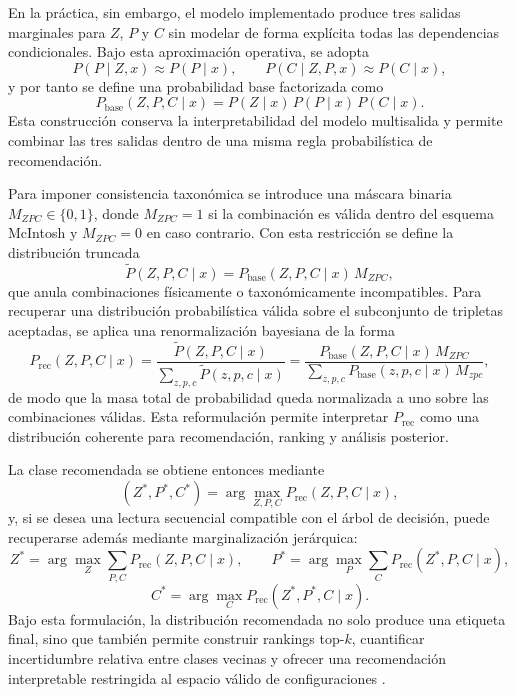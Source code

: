 En la práctica, sin embargo, el modelo implementado produce tres salidas marginales para $Z$, $P$ y $C$ sin modelar de forma explícita todas las dependencias condicionales. Bajo esta aproximación operativa, se adopta
\begin{equation}
P(P\mid Z,x)\approx P(P\mid x),
\qquad
P(C\mid Z,P,x)\approx P(C\mid x),
\end{equation}
y por tanto se define una probabilidad base factorizada como
\begin{equation}
P_{\mathrm{base}}(Z,P,C\mid x)=P(Z\mid x)\,P(P\mid x)\,P(C\mid x).
\end{equation}
Esta construcción conserva la interpretabilidad del modelo multisalida y permite combinar las tres salidas dentro de una misma regla probabilística de recomendación.

Para imponer consistencia taxonómica se introduce una máscara binaria $M_{ZPC}\in\{0,1\}$, donde $M_{ZPC}=1$ si la combinación es válida dentro del esquema McIntosh y $M_{ZPC}=0$ en caso contrario. Con esta restricción se define la distribución truncada
\begin{equation}
\widetilde{P}(Z,P,C\mid x)=P_{\mathrm{base}}(Z,P,C\mid x)\,M_{ZPC},
\end{equation}
que anula combinaciones físicamente o taxonómicamente incompatibles. Para recuperar una distribución probabilística válida sobre el subconjunto de tripletas aceptadas, se aplica una renormalización bayesiana de la forma
\begin{equation}
P_{\mathrm{rec}}(Z,P,C\mid x)=
\frac{\widetilde{P}(Z,P,C\mid x)}{\sum_{z,p,c}\widetilde{P}(z,p,c\mid x)}
=
\frac{P_{\mathrm{base}}(Z,P,C\mid x)\,M_{ZPC}}{\sum_{z,p,c}P_{\mathrm{base}}(z,p,c\mid x)\,M_{zpc}},
\end{equation}
de modo que la masa total de probabilidad queda normalizada a uno sobre las combinaciones válidas. Esta reformulación permite interpretar $P_{\mathrm{rec}}$ como una distribución coherente para recomendación, ranking y análisis posterior.

La clase recomendada se obtiene entonces mediante
\begin{equation}
(Z^{\ast},P^{\ast},C^{\ast})=\arg\max_{Z,P,C} P_{\mathrm{rec}}(Z,P,C\mid x),
\end{equation}
y, si se desea una lectura secuencial compatible con el árbol de decisión, puede recuperarse además mediante marginalización jerárquica:
\begin{equation}
Z^{\ast}=\arg\max_{Z}\sum_{P,C}P_{\mathrm{rec}}(Z,P,C\mid x),
\qquad
P^{\ast}=\arg\max_{P}\sum_{C}P_{\mathrm{rec}}(Z^{\ast},P,C\mid x),
\end{equation}
\begin{equation}
C^{\ast}=\arg\max_{C}P_{\mathrm{rec}}(Z^{\ast},P^{\ast},C\mid x).
\end{equation}
Bajo esta formulación, la distribución recomendada no solo produce una etiqueta final, sino que también permite construir rankings top-$k$, cuantificar incertidumbre relativa entre clases vecinas y ofrecer una recomendación interpretable restringida al espacio válido de configuraciones \citep{sayez2023sunscc}.


